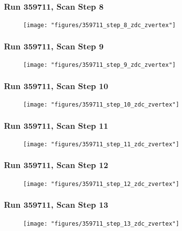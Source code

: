\begin{frame}
\frametitle{Run 359711, Scan Step 8}
\begin{figure}
\begin{center}
\texttt{[image: "figures/359711\_step\_8\_zdc\_zvertex"]}
\caption{ }
\label{fig:359711_step_8_zdc_zvertex}
\end{center}\end{figure}
\end{frame}

\begin{frame}
\frametitle{Run 359711, Scan Step 9}
\begin{figure}
\begin{center}
\texttt{[image: "figures/359711\_step\_9\_zdc\_zvertex"]}
\caption{ }
\label{fig:359711_step_9_zdc_zvertex}
\end{center}\end{figure}
\end{frame}

\begin{frame}
\frametitle{Run 359711, Scan Step 10}
\begin{figure}
\begin{center}
\texttt{[image: "figures/359711\_step\_10\_zdc\_zvertex"]}
\caption{ }
\label{fig:359711_step_10_zdc_zvertex}
\end{center}\end{figure}
\end{frame}

\begin{frame}
\frametitle{Run 359711, Scan Step 11}
\begin{figure}
\begin{center}
\texttt{[image: "figures/359711\_step\_11\_zdc\_zvertex"]}
\caption{ }
\label{fig:359711_step_11_zdc_zvertex}
\end{center}\end{figure}
\end{frame}

\begin{frame}
\frametitle{Run 359711, Scan Step 12}
\begin{figure}
\begin{center}
\texttt{[image: "figures/359711\_step\_12\_zdc\_zvertex"]}
\caption{ }
\label{fig:359711_step_12_zdc_zvertex}
\end{center}\end{figure}
\end{frame}

\begin{frame}
\frametitle{Run 359711, Scan Step 13}
\begin{figure}
\begin{center}
\texttt{[image: "figures/359711\_step\_13\_zdc\_zvertex"]}
\caption{ }
\label{fig:359711_step_13_zdc_zvertex}
\end{center}\end{figure}
\end{frame}

